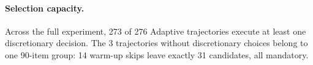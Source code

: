 \paragraph{Selection capacity.}
Across the full experiment, 273 of 276 Adaptive trajectories execute at least one discretionary decision. The 3 trajectories without discretionary choices belong to one 90-item group: 14 warm-up skips leave exactly 31 candidates, all mandatory.
